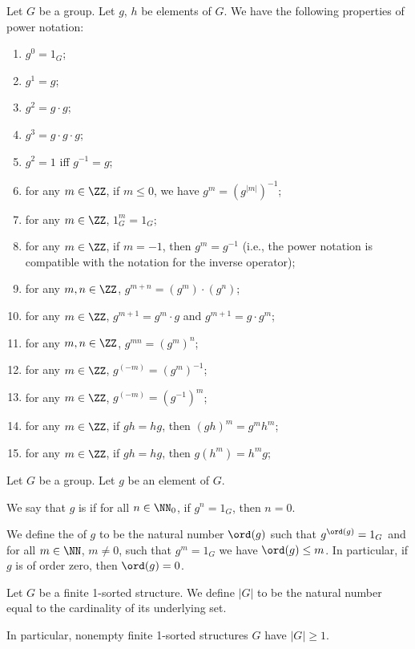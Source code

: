 \begin{theorem}
Let $G$ be a group. Let $g$, $h$ be elements of $G$. We have the
following properties of power notation:
\begin{enumerate}
\item $g^{0}=1_{G}$;
\item $g^{1}=g$;
\item $g^{2}=g\cdot g$;
\item $g^{3}=g\cdot g\cdot g$;
\item $g^{2}=1$ iff $g^{-1}=g$;
\item for any $m\in\ZZ$, if $m\leq0$, we have $g^{m}=(g^{|m|})^{-1}$;
\item for any $m\in\ZZ$, $1_{G}^{m}=1_{G}$;
\item for any $m\in\ZZ$, if $m=-1$, then $g^{m}=g^{-1}$ (i.e., the
  power notation is compatible with the notation for the inverse operator);
\item for any $m,n\in\ZZ$, $g^{m+n}=(g^{m})\cdot(g^{n})$;
\item for any $m\in\ZZ$, $g^{m+1}=g^{m}\cdot g$ and $g^{m+1}=g\cdot g^{m}$;
\item for any $m,n\in\ZZ$, $g^{mn}=(g^{m})^{n}$;
\item for any $m\in\ZZ$, $g^{(-m)}=(g^{m})^{-1}$;
\item for any $m\in\ZZ$, $g^{(-m)}=(g^{-1})^{m}$;
\item for any $m\in\ZZ$, if $gh=hg$, then $(gh)^{m}=g^{m}h^{m}$;
\item for any $m\in\ZZ$, if $gh=hg$, then $g(h^{m})=h^{m}g$;
\end{enumerate}
\end{theorem}

\begin{definition}
Let $G$ be a group. Let $g$ be an element of $G$.


We say that $g$ is  if for all
$n\in\NN_{0}$, if $g^{n}=1_{G}$, then $n=0$.


We define the  of $g$ to be the
natural number $\ord(g)$ such that $g^{\ord(g)}=1_{G}$ and for all
$m\in\NN$, $m\neq0$, such that $g^{m}=1_{G}$ we have $\ord(g)\leq m$.
In particular, if $g$ is of order zero, then $\ord(g)=0$.
\end{definition}

\begin{definition}
Let $G$ be a finite 1-sorted structure. We define $|G|$ to be the
natural number equal to the cardinality of its underlying set.

In particular, nonempty finite 1-sorted structures $G$ have $|G|\geq1$.
\end{definition}

